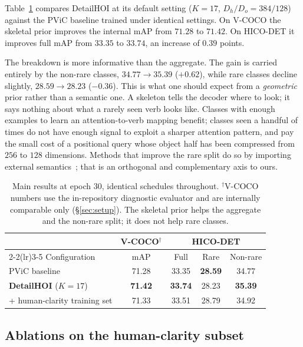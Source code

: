 \documentclass[12pt,a4paper]{article}
\begin{document}
Table~\ref{tab:main} compares DetailHOI at its default setting ($K{=}17$,
$D_h/D_o = 384/128$) against the PViC baseline trained under identical settings.
On V-COCO the skeletal prior improves the internal mAP from $71.28$ to $71.42$.
On HICO-DET it improves full mAP from $33.35$ to $33.74$, an increase of $0.39$
points.

The breakdown is more informative than the aggregate. The gain is carried
entirely by the non-rare classes, $34.77 \rightarrow 35.39$ ($+0.62$), while
rare classes decline slightly, $28.59 \rightarrow 28.23$ ($-0.36$). This is
what one should expect from a \emph{geometric} prior rather than a semantic one.
A skeleton tells the decoder where to look; it says nothing about what a rarely
seen verb looks like. Classes with enough examples to learn an
attention-to-verb mapping benefit; classes seen a handful of times do not have
enough signal to exploit a sharper attention pattern, and pay the small cost of
a positional query whose object half has been compressed from $256$ to $128$
dimensions. Methods that improve the rare split do so by importing external
semantics~\cite{liao2022genvlkt,ning2023hoiclip,cao2023unihoi}; that is an
orthogonal and complementary axis to ours.

\begin{table}[t]
\centering\small
\caption{Main results at epoch $30$, identical schedules throughout.
$^{\dagger}$V-COCO numbers use the in-repository diagnostic evaluator and are
internally comparable only (\S\ref{sec:setup}). The skeletal prior helps the
aggregate and the non-rare split; it does not help rare classes.}
\label{tab:main}
\setlength{\tabcolsep}{4pt}
\begin{tabular}{lcccc}
\toprule
& V-COCO$^{\dagger}$ & \multicolumn{3}{c}{HICO-DET} \\
\cmidrule(lr){2-2}\cmidrule(lr){3-5}
Configuration & mAP & Full & Rare & Non-rare \\
\midrule
PViC baseline                     & 71.28 & 33.35 & \textbf{28.59} & 34.77 \\
\textbf{DetailHOI} ($K{=}17$)     & \textbf{71.42} & \textbf{33.74} & 28.23 & \textbf{35.39} \\
\quad + human-clarity training set & 71.33 & 33.51 & 28.79 & 34.92 \\
\bottomrule
\end{tabular}
\end{table}

\subsection{Ablations on the human-clarity subset}
\label{sec:ablation}
\end{document}
